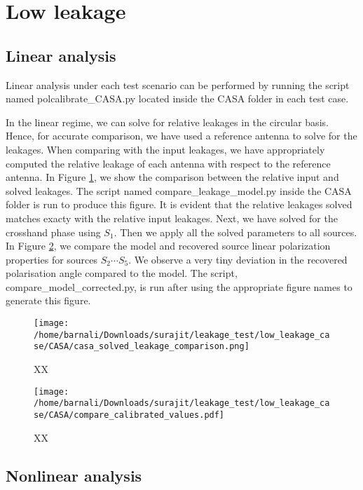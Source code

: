 \documentclass{article}
\begin{document}
\section{Low leakage}

\subsection{Linear analysis}

Linear analysis under each test scenario can be performed by running the script named polcalibrate\_CASA.py located inside the CASA folder in each test case.

In the linear regime, we can solve for relative leakages in the circular basis.  Hence, for accurate comparison, we have used a reference antenna to solve for the leakages. When comparing with the input leakages, we have appropriately computed the relative leakage of each antenna with respect to the reference antenna. In Figure \ref{fig:linear_CASA_leak_comparison}, we show the comparison between the relative input and solved leakages. The script named compare\_leakage\_model.py inside the CASA folder is run to produce this figure. It is evident that the relative leakages solved matches exacty with the relative input leakages. Next, we have solved for the crosshand phase using $S_1$. Then we apply all the solved parameters to all sources. In Figure \ref{fig:compare_input_output_source_params}, we compare the model and recovered source linear polarization properties for sources $S_2\cdots S_5$. We observe a very tiny deviation in the recovered polarisation angle compared to the model. The script, compare\_model\_corrected.py, is run after using the appropriate figure names to generate this figure.

\begin{figure}
\centering
\texttt{[image: /home/barnali/Downloads/surajit/leakage\_test/low\_leakage\_case/CASA/casa\_solved\_leakage\_comparison.png]}
\caption{XX}
\label{fig:linear_CASA_leak_comparison}
\end{figure} 

\begin{figure}
\centering
\texttt{[image: /home/barnali/Downloads/surajit/leakage\_test/low\_leakage\_case/CASA/compare\_calibrated\_values.pdf]}
\caption{XX}
\label{fig:compare_input_output_source_params}
\end{figure}

\subsection{Nonlinear analysis}
\end{document}
